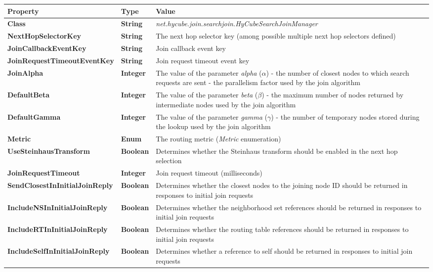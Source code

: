 \begin{table}
\scriptsize
\begin{center}
\begin{tabular}{p{5cm} p{1.5cm} p{8.0cm}}
	\hline
	\textbf{Property}						& \textbf{Type}					& \textbf{Value}					\\[1mm]
    \hline
	\textbf{Class}							& \textbf{String}				& \textit{net.hycube.join.searchjoin.HyCubeSearchJoinManager}										\\[1.5mm]	
    \textbf{NextHopSelectorKey}				& \textbf{String}				& The next hop selector key (among possible multiple next hop selectors defined)		\\[1.5mm]	
	\textbf{JoinCallbackEventKey}			& \textbf{String}				& Join callback event key				\\[1.5mm]	
	\textbf{JoinRequestTimeoutEventKey}		& \textbf{String}				& Join request timeout event key		\\[1.5mm]	
	
	\textbf{JoinAlpha}						& \textbf{Integer}				& The value of the parameter \emph{alpha} ($\alpha$) - the number of closest nodes to which search requests are sent - the parallelism factor used by the join algorithm	\\[1.5mm]	
	\textbf{DefaultBeta}					& \textbf{Integer}				& The value of the parameter \emph{beta} ($\beta$) - the maximum number of nodes returned by intermediate nodes used by the join algorithm		\\[1.5mm]	
	\textbf{DefaultGamma}					& \textbf{Integer}				& The value of the parameter \emph{gamma} ($\gamma$) - the number of temporary nodes stored during the lookup used by the join algorithm		\\[1.5mm]	
	
	\textbf{Metric}							& \textbf{Enum}					& The routing metric (\emph{Metric} enumeration)											\\[1.5mm]
	\textbf{UseSteinhausTransform}			& \textbf{Boolean}				& Determines whether the Steinhaus transform should be enabled in the next hop selection				\\[1.5mm]	
	\textbf{JoinRequestTimeout}				& \textbf{Integer}				& Join request timeout (milliseconds) 			\\[1.5mm]	
	
	\textbf{SendClosestInInitialJoinReply}				& \textbf{Boolean}				& Determines whether the closest nodes to the joining node ID should be returned in responses to initial join requests 			\\[1.5mm]	
	\textbf{IncludeNSInInitialJoinReply}				& \textbf{Boolean}				& Determines whether the neighborhood set references should be returned in responses to initial join requests 			\\[1.5mm]	
	\textbf{IncludeRTInInitialJoinReply}				& \textbf{Boolean}				& Determines whether the routing table references should be returned in responses to initial join requests 			\\[1.5mm]	
	\textbf{IncludeSelfInInitialJoinReply}				& \textbf{Boolean}				& Determines whether a reference to self should be returned in responses to initial join requests 			\\[1.5mm]	
	

\end{tabular}
\end{center}
\end{table}
